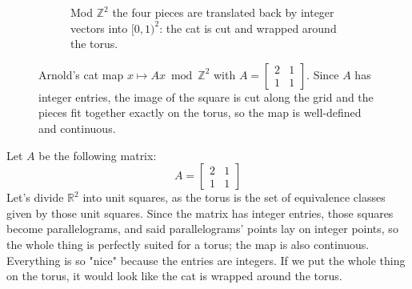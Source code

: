\begin{example}[Standard example: Arnold's cat map, d=2]
\begin{figure}[ht]
\begin{subfigure}[t]{0.35\textwidth}
            \caption{Mod $\mathbb{Z}^2$ the four pieces are translated back by integer vectors into $[0,1)^2$: the cat is cut and wrapped around the torus.}
            \label{fig:cat_b}
    \end{subfigure}

    \caption{Arnold's cat map $x\mapsto Ax \bmod \mathbb{Z}^2$ with $A=\begin{bmatrix}2&1\\1&1\end{bmatrix}$.
    Since $A$ has integer entries, the image of the square is cut along the grid and the pieces
    fit together exactly on the torus, so the map is well-defined and continuous.}
    \label{fig:arnold_cat}
\end{figure}

    Let $A$ be the following matrix: \begin{equation*}
        A=\begin{bmatrix}
            2 & 1 \\
            1 & 1
        \end{bmatrix}
    \end{equation*}
    Let's divide $\mathbb{R}^2$ into unit squares, as the torus is the set of equivalence classes given by those unit squares. Since the matrix has integer entries, those squares become parallelograms, and said parallelograms' points lay on integer points, so the whole thing is perfectly suited for a torus; the map is also continuous. Everything is so "nice" because the entries are integers. If we put the whole thing on the torus, it would look like the cat is wrapped around the torus. 

    \begin{figure}[ht]
        \centering
\end{figure}
\end{example}
